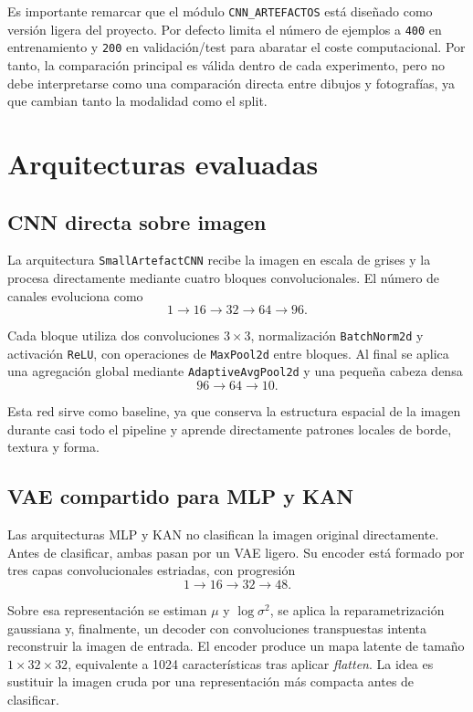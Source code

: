 \documentclass[11pt,a4paper]{report}
\begin{document}
Es importante remarcar que el m\'odulo \texttt{CNN\_ARTEFACTOS} est\'a dise\~nado como versi\'on ligera del proyecto. Por defecto limita el n\'umero de ejemplos a \texttt{400} en entrenamiento y \texttt{200} en validaci\'on/test para abaratar el coste computacional. Por tanto, la comparaci\'on principal es v\'alida dentro de cada experimento, pero no debe interpretarse como una comparaci\'on directa entre dibujos y fotograf\'ias, ya que cambian tanto la modalidad como el split.

\section{Arquitecturas evaluadas}

\subsection{CNN directa sobre imagen}

La arquitectura \texttt{SmallArtefactCNN} recibe la imagen en escala de grises y la procesa directamente mediante cuatro bloques convolucionales. El n\'umero de canales evoluciona como
\[
1 \rightarrow 16 \rightarrow 32 \rightarrow 64 \rightarrow 96.
\]

Cada bloque utiliza dos convoluciones $3\times3$, normalizaci\'on \texttt{BatchNorm2d} y activaci\'on \texttt{ReLU}, con operaciones de \texttt{MaxPool2d} entre bloques. Al final se aplica una agregaci\'on global mediante \texttt{AdaptiveAvgPool2d} y una peque\~na cabeza densa
\[
96 \rightarrow 64 \rightarrow 10.
\]

Esta red sirve como baseline, ya que conserva la estructura espacial de la imagen durante casi todo el pipeline y aprende directamente patrones locales de borde, textura y forma.

\subsection{VAE compartido para MLP y KAN}

Las arquitecturas MLP y KAN no clasifican la imagen original directamente. Antes de clasificar, ambas pasan por un VAE ligero. Su encoder est\'a formado por tres capas convolucionales estriadas, con progresi\'on
\[
1 \rightarrow 16 \rightarrow 32 \rightarrow 48.
\]

Sobre esa representaci\'on se estiman $\mu$ y $\log\sigma^2$, se aplica la reparametrizaci\'on gaussiana y, finalmente, un decoder con convoluciones transpuestas intenta reconstruir la imagen de entrada. El encoder produce un mapa latente de tama\~no $1 \times 32 \times 32$, equivalente a 1024 caracter\'isticas tras aplicar \textit{flatten}. La idea es sustituir la imagen cruda por una representaci\'on m\'as compacta antes de clasificar.
\end{document}
